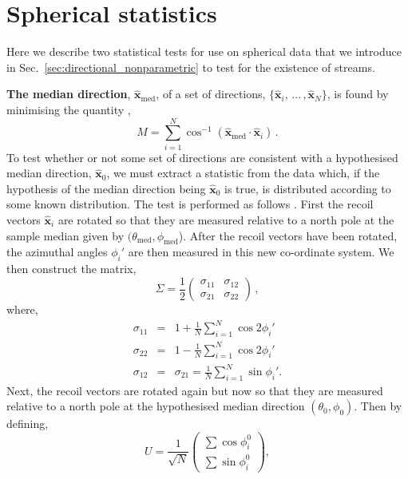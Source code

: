 \chapter{Spherical statistics}\label{app:dirstats}

Here we describe two statistical tests for use on spherical data that we introduce in Sec.~\ref{sec:directional_nonparametric} to test for the existence of streams.

{\bf The median direction}, $\hat{\textbf{x}}_\textrm{med}$, of a set of directions, $\lbrace \hat{\textbf{x}}_i,\, ...\, , \hat{\textbf{x}}_N\rbrace$, is found by minimising the quantity \cite{fisher1987statistical},
\begin{equation}
      M = \sum_{i=1}^{N} \cos^{-1}(\hat{\textbf{x}}_\textrm{med} \cdot \hat{\textbf{x}}_i) \, .
\end{equation}
To test whether or not some set of directions are consistent with a hypothesised median direction, $\hat{\textbf{x}}_0$, we must extract a statistic from the data which, if the hypothesis of the median direction being $\hat{\textbf{x}}_0$ is true, is distributed according to some known distribution. The test is performed as follows \cite{fisher1987statistical}. First the recoil vectors $\hat{\textbf{x}}_i$ are rotated so that they are measured relative to a north pole at the sample median given by $(\theta_\textrm{med},\phi_\textrm{med}$). After the recoil vectors have been rotated, the azimuthal angles $\phi_i'$ are then measured in this new co-ordinate system. We then construct the matrix,
\begin{equation}
      \Sigma = \frac{1}{2}
      \begin{pmatrix}
	      \sigma_{11} & \sigma_{12} \\
	      \sigma_{21} & \sigma_{22}
      \end{pmatrix}\, ,
\end{equation}
where,
\begin{eqnarray}
      \sigma_{11} &=& 1 + \frac{1}{N}\sum_{i=1}^{N} \cos 2\phi_i' \\
      \sigma_{22} &=& 1 - \frac{1}{N}\sum_{i=1}^{N} \cos 2\phi_i' \\
      \sigma_{12} &=& \sigma_{21} = \frac{1}{N}\sum_{i=1}^{N} \sin \phi_i'.
\end{eqnarray}
Next, the recoil vectors are rotated again but now so that they are measured relative to a north pole at the hypothesised median direction $(\theta_0,\phi_0)$. Then by defining,
\begin{equation}
      U = \frac{1}{\sqrt{N}} 
      \begin{pmatrix}
	      \sum \cos \phi_i^0 \\
	      \sum \sin \phi_i^0
      \end{pmatrix},
\end{equation}
